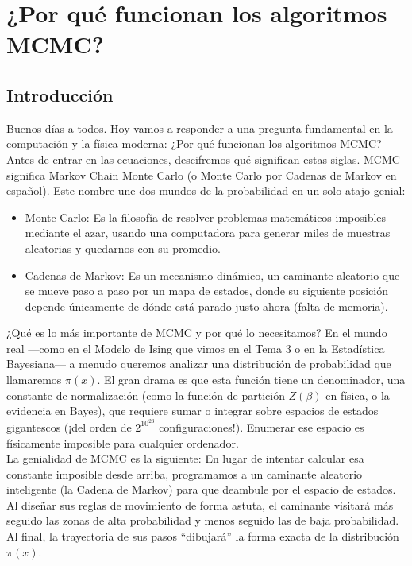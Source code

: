 \chapter{¿Por qué funcionan los algoritmos MCMC?}
\section{Introducción}
Buenos días a todos. Hoy vamos a responder a una pregunta fundamental en la computación y la física moderna: ¿Por qué funcionan los algoritmos MCMC?\\

\noindent
Antes de entrar en las ecuaciones, descifremos qué significan estas siglas. MCMC significa Markov Chain Monte Carlo (o Monte Carlo por Cadenas de Markov en español). Este nombre une dos mundos de la probabilidad en un solo atajo genial:

\begin{itemize}
    \item Monte Carlo: Es la filosofía de resolver problemas matemáticos imposibles mediante el azar, usando una computadora para generar miles de muestras aleatorias y quedarnos con su promedio.
    \item Cadenas de Markov: Es un mecanismo dinámico, un caminante aleatorio que se mueve paso a paso por un mapa de estados, donde su siguiente posición depende únicamente de dónde está parado justo ahora (falta de memoria).
\end{itemize}
¿Qué es lo más importante de MCMC y por qué lo necesitamos? En el mundo real —como en el Modelo de Ising que vimos en el Tema 3 o en la Estadística Bayesiana— a menudo queremos analizar una distribución de probabilidad que llamaremos $\pi(x)$. El gran drama es que esta función tiene un denominador, una constante de normalización (como la función de partición $Z(\beta)$ en física, o la evidencia en Bayes), que requiere sumar o integrar sobre espacios de estados gigantescos (¡del orden de $2^{10^{23}}$ configuraciones!). Enumerar ese espacio es físicamente imposible para cualquier ordenador. \\

\noindent
La genialidad de MCMC es la siguiente: En lugar de intentar calcular esa constante imposible desde arriba, programamos a un caminante aleatorio inteligente (la Cadena de Markov) para que deambule por el espacio de estados. Al diseñar sus reglas de movimiento de forma astuta, el caminante visitará más seguido las zonas de alta probabilidad y menos seguido las de baja probabilidad. Al final, la trayectoria de sus pasos ``dibujará'' la forma exacta de la distribución $\pi(x)$. \\

